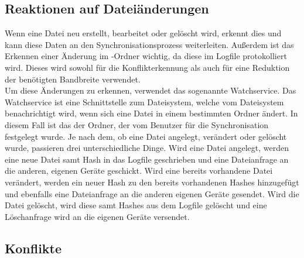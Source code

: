 \subsection{Reaktionen auf Dateiänderungen}
Wenn eine Datei neu erstellt, bearbeitet oder gelöscht wird, erkennt dies \sblit und kann diese Daten an den Synchronisationsprozess weiterleiten. Außerdem ist das Erkennen einer Änderung im \sblit-Ordner wichtig, da diese im Logfile protokolliert wird. Dieses wird sowohl für die Konflikterkennung  als auch für eine Reduktion der benötigten Bandbreite  verwendet.\\
Um diese Änderungen zu erkennen, verwendet \sblit das sogenannte Watchservice. Das Watchservice ist eine Schnittstelle zum Dateisystem, welche vom Dateisystem benachrichtigt wird, wenn sich eine Datei in einem bestimmten Ordner ändert. In diesem Fall ist das der Ordner, der vom Benutzer für die Synchronisation festgelegt wurde. Je nach dem, ob eine Datei angelegt, verändert oder gelöscht wurde, passieren drei unterschiedliche Dinge. Wird eine Datei angelegt, werden eine neue Datei samt Hash in das Logfile geschrieben und eine Dateianfrage an die anderen, eigenen Geräte geschickt. Wird eine bereits vorhandene Datei verändert, werden ein neuer Hash zu den bereits vorhandenen Hashes hinzugefügt und ebenfalls eine Dateianfrage an die anderen eigenen Geräte gesendet. Wird die Datei gelöscht, wird diese samt Hashes aus dem Logfile gelöscht und eine Löschanfrage wird an die eigenen Geräte versendet.
 
\subsection{Konflikte}\label{Konflikt}
